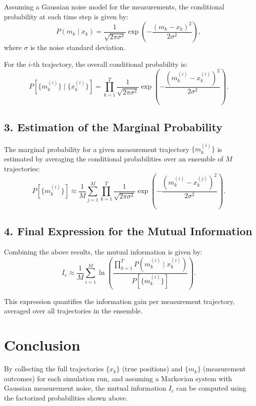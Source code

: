 \documentclass[12pt]{article}
\begin{document}
Assuming a Gaussian noise model for the measurements, the conditional probability at each time step is given by:
\begin{equation}
P(m_k \mid x_k) = \frac{1}{\sqrt{2\pi\sigma^2}} \exp\left(-\frac{(m_k - x_k)^2}{2\sigma^2}\right),
\end{equation}
where \(\sigma\) is the noise standard deviation.

For the \(i\)-th trajectory, the overall conditional probability is:
\begin{equation}
P[\{m_k^{(i)}\} \mid \{x_k^{(i)}\}] = \prod_{k=1}^{T} \frac{1}{\sqrt{2\pi\sigma^2}} \exp\left(-\frac{(m_k^{(i)} - x_k^{(i)})^2}{2\sigma^2}\right).
\end{equation}

\subsection*{3. Estimation of the Marginal Probability}

The marginal probability for a given measurement trajectory \(\{m_k^{(i)}\}\) is estimated by averaging the conditional probabilities over an ensemble of \(M\) trajectories:
\begin{equation}
P[\{m_k^{(i)}\}] \approx \frac{1}{M} \sum_{j=1}^{M} \prod_{k=1}^{T} \frac{1}{\sqrt{2\pi\sigma^2}} \exp\left(-\frac{(m_k^{(i)} - x_k^{(j)})^2}{2\sigma^2}\right).
\end{equation}

\subsection*{4. Final Expression for the Mutual Information}

Combining the above results, the mutual information is given by:
\begin{equation}
I_c \approx \frac{1}{M} \sum_{i=1}^{M} \ln \left( \frac{\prod_{k=1}^{T} P(m_k^{(i)} \mid x_k^{(i)})}{P[\{m_k^{(i)}\}]} \right).
\end{equation}

This expression quantifies the information gain per measurement trajectory, averaged over all trajectories in the ensemble.

\section*{Conclusion}

By collecting the full trajectories \(\{x_k\}\) (true positions) and \(\{m_k\}\) (measurement outcomes) for each simulation run, and assuming a Markovian system with Gaussian measurement noise, the mutual information \(I_c\) can be computed using the factorized probabilities shown above.
\end{document}
